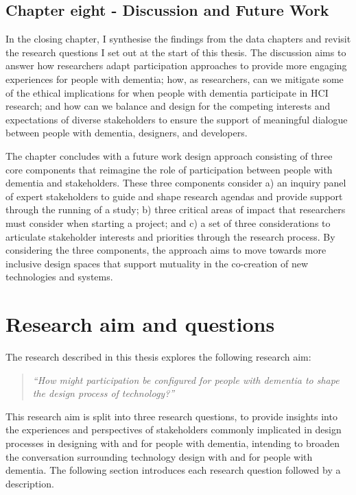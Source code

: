 \subsection{Chapter eight - Discussion and Future Work}
\label{Intro:ChapterEight}
In the closing chapter, I synthesise the findings from the data chapters and revisit the research questions I set out at the start of this thesis. The discussion aims to answer how researchers adapt participation approaches to provide more engaging experiences for people with dementia; how, as researchers, can we mitigate some of the ethical implications for when people with dementia participate in HCI research; and how can we balance and design for the competing interests and expectations of diverse stakeholders to ensure the support of meaningful dialogue between people with dementia, designers, and developers. 

The chapter concludes with a future work design approach consisting of three core components that reimagine the role of participation between people with dementia and stakeholders. These three components consider a) an inquiry panel of expert stakeholders to guide and shape research agendas and provide support through the running of a study; b) three critical areas of impact that researchers must consider when starting a project; and c) a set of three considerations to articulate stakeholder interests and priorities through the research process. By considering the three components, the approach aims to move towards more inclusive design spaces that support mutuality in the co-creation of new technologies and systems.

\section{Research aim and questions}
\label{Intro:RQ}
The research described in this thesis explores the following research aim:
\begin{quote}
    \textit{``How might participation be configured for people with dementia to shape the design process of technology?''}
\end{quote}
This research aim is split into three research questions, to provide insights into the experiences and perspectives of stakeholders commonly implicated in design processes in designing with and for people with dementia, intending to broaden the conversation surrounding technology design with and for people with dementia. The following section introduces each research question followed by a description.

